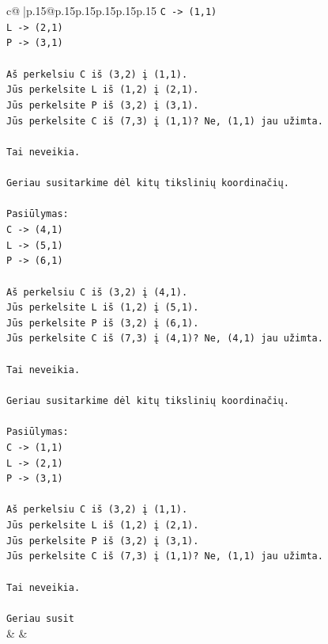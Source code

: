 \documentclass{article}
\begin{document}
{\begin{supertabular}{c@{$\;$}|p{.15\linewidth}@{}p{.15\linewidth}p{.15\linewidth}p{.15\linewidth}p{.15\linewidth}p{.15\linewidth}}
{{{\texttt{C {-}> (1,1)} \\
\texttt{L {-}> (2,1)} \\
\texttt{P {-}> (3,1)} \\
\\ 
\texttt{Aš perkelsiu C iš (3,2) į (1,1).} \\
\texttt{Jūs perkelsite L iš (1,2) į (2,1).} \\
\texttt{Jūs perkelsite P iš (3,2) į (3,1).} \\
\texttt{Jūs perkelsite C iš (7,3) į (1,1)? Ne, (1,1) jau užimta.} \\
\\ 
\texttt{Tai neveikia.} \\
\\ 
\texttt{Geriau susitarkime dėl kitų tikslinių koordinačių.} \\
\\ 
\texttt{Pasiūlymas:} \\
\texttt{C {-}> (4,1)} \\
\texttt{L {-}> (5,1)} \\
\texttt{P {-}> (6,1)} \\
\\ 
\texttt{Aš perkelsiu C iš (3,2) į (4,1).} \\
\texttt{Jūs perkelsite L iš (1,2) į (5,1).} \\
\texttt{Jūs perkelsite P iš (3,2) į (6,1).} \\
\texttt{Jūs perkelsite C iš (7,3) į (4,1)? Ne, (4,1) jau užimta.} \\
\\ 
\texttt{Tai neveikia.} \\
\\ 
\texttt{Geriau susitarkime dėl kitų tikslinių koordinačių.} \\
\\ 
\texttt{Pasiūlymas:} \\
\texttt{C {-}> (1,1)} \\
\texttt{L {-}> (2,1)} \\
\texttt{P {-}> (3,1)} \\
\\ 
\texttt{Aš perkelsiu C iš (3,2) į (1,1).} \\
\texttt{Jūs perkelsite L iš (1,2) į (2,1).} \\
\texttt{Jūs perkelsite P iš (3,2) į (3,1).} \\
\texttt{Jūs perkelsite C iš (7,3) į (1,1)? Ne, (1,1) jau užimta.} \\
\\ 
\texttt{Tai neveikia.} \\
\\ 
\texttt{Geriau susit} \\
            }
        }
    }
    & & \\ \\


\end{supertabular}}
\end{document}
